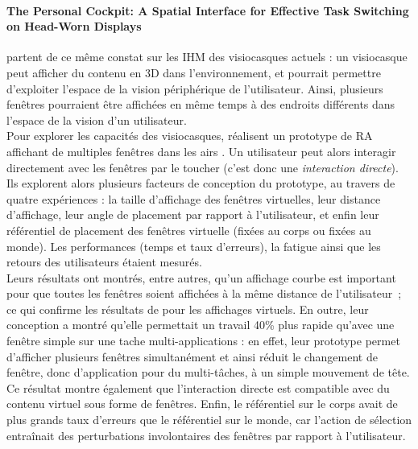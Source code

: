 \paragraph{\foreignlanguage{english}{The Personal Cockpit: A Spatial Interface for Effective Task Switching on Head-Worn Displays}}
\citet{EnsFinneganIrani2014} partent de ce même constat sur les IHM des visiocasques actuels : un visiocasque peut afficher du contenu en 3D dans l'environnement, et pourrait permettre d'exploiter l'espace de la vision périphérique de l'utilisateur. Ainsi, plusieurs fenêtres pourraient être affichées en même temps à des endroits différents dans l'espace de la vision d'un utilisateur.\\
Pour explorer les capacités des visiocasques, \citeauthor{EnsFinneganIrani2014} réalisent un prototype de RA affichant de multiples fenêtres dans les airs . Un utilisateur peut alors interagir directement avec les fenêtres par le toucher (c'est donc une \emph{interaction directe}). Ils explorent alors plusieurs facteurs de conception du prototype, au travers de quatre expériences : la taille d'affichage des fenêtres virtuelles, leur distance d'affichage, leur angle de placement par rapport à l'utilisateur, et enfin leur référentiel de placement des fenêtres virtuelle (fixées au corps ou fixées au monde). Les performances (temps et taux d'erreurs), la fatigue ainsi que les retours des utilisateurs étaient mesurés.\\ 
Leurs résultats ont montrés, entre autres, qu'un affichage courbe est important pour que toutes les fenêtres soient affichées à la même distance de l'utilisateur~; ce qui confirme les résultats de \citet{ShuppBallYostEtAl2006} pour les affichages virtuels. En outre, leur conception a montré qu'elle permettait un travail 40\% plus rapide qu'avec une fenêtre simple sur une tache multi-applications : en effet, leur prototype permet d'afficher plusieurs fenêtres simultanément et ainsi réduit le changement de fenêtre, donc d'application pour du multi-tâches, à un simple mouvement de tête. Ce résultat montre également que l'interaction directe est compatible avec du contenu virtuel sous forme de fenêtres. Enfin, le référentiel sur le corps avait de plus grands taux d'erreurs que le référentiel sur le monde, car l'action de sélection entraînait des perturbations involontaires des fenêtres par rapport à l'utilisateur.\\ 
